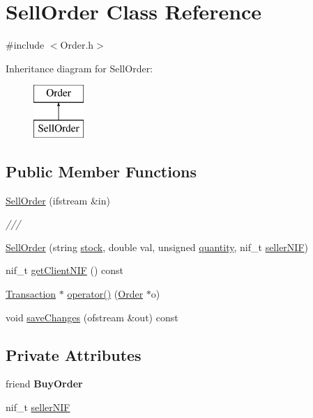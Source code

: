 \hypertarget{class_sell_order}{}\section{Sell\+Order Class Reference}
\label{class_sell_order}


{\ttfamily \#include $<$Order.\+h$>$}

Inheritance diagram for Sell\+Order\+:\begin{figure}[H]
\begin{center}
\leavevmode
\includegraphics[height=2.000000cm]{class_sell_order}
\end{center}
\end{figure}
\subsection*{Public Member Functions}
\begin{DoxyCompactItemize}
\item 
\hyperlink{class_sell_order_ac89fdde112f2f9aac52633a2d9507bea}{Sell\+Order} (ifstream \&in)
\begin{DoxyCompactList}\small\item\em /// \end{DoxyCompactList}\item 
\hyperlink{class_sell_order_a19145616a9cceec182bdcb00816b89c5}{Sell\+Order} (string \hyperlink{class_order_aafb6dfab2a1c253eefd78840b27dcd2e}{stock}, double val, unsigned \hyperlink{class_order_ab02e2baeb8c57217a20c9124df3ba11d}{quantity}, nif\+\_\+t \hyperlink{class_sell_order_a986130b91a0dc2f234dffc10b24c3183}{seller\+N\+IF})
\item 
nif\+\_\+t \hyperlink{class_sell_order_a2f34e30d8bc5c891c40d8b80342cc34d}{get\+Client\+N\+IF} () const
\item 
\hyperlink{class_transaction}{Transaction} $\ast$ \hyperlink{class_sell_order_ae4e19807431bcd87c7126d0c644ff209}{operator()} (\hyperlink{class_order}{Order} $\ast$o)
\item 
void \hyperlink{class_sell_order_a81c6ea39652c38a718803c036767787f}{save\+Changes} (ofstream \&out) const
\end{DoxyCompactItemize}
\subsection*{Private Attributes}
\begin{DoxyCompactItemize}
\item 
\mbox{\label{class_sell_order_a9c9a7419b6974313ef6b5e4e16be6b8a}} 
friend {\bfseries Buy\+Order}
\item 
nif\+\_\+t \hyperlink{class_sell_order_a986130b91a0dc2f234dffc10b24c3183}{seller\+N\+IF}
\end{DoxyCompactItemize}
